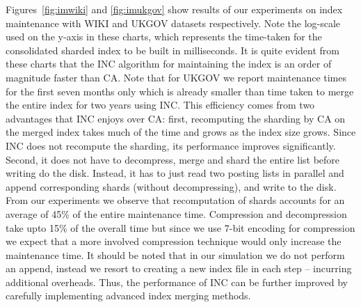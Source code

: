 Figures~\ref{fig:imwiki} and \ref{fig:imukgov} show results of our
experiments on index maintenance with WIKI and UKGOV datasets
respectively. Note the log-scale used on the y-axis in these charts,
which represents the time-taken for the consolidated sharded index to
be built in milliseconds. It is quite evident from these charts that
the INC algorithm for maintaining the index is an order of magnitude
faster than CA. Note that for UKGOV we report maintenance times for the first seven months only which is already smaller than time taken to merge the entire index for two years using INC. This efficiency comes from two advantages that INC
enjoys over CA: first, recomputing the sharding by CA on the merged
index takes much of the time and grows as the index size grows. Since
INC does not recompute the sharding, its performance improves
significantly. Second, it does not have to decompress, merge and shard
the entire list before writing do the disk. Instead, it has to just
read two posting lists in parallel and append corresponding shards
(without decompressing), and write to the disk. From our experiments we observe that recomputation of shards accounts for an average of 45\% of the entire maintenance time. Compression and decompression take upto 15\% of the overall time but since we use 7-bit encoding for compression we expect that a more involved compression technique would only increase the maintenance time. It should be noted
that in our simulation we do not perform an append, instead we resort
to creating a new index file in each step -- incurring additional
overheads. Thus, the performance of INC can be further improved by
carefully implementing advanced index merging methods.



